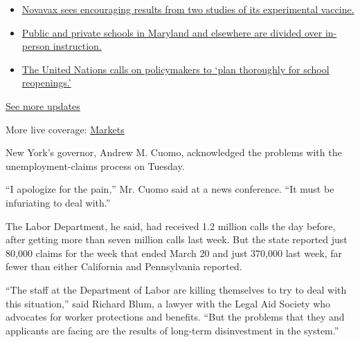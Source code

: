 \begin{itemize}
\tightlist
\item
  \href{https://www.nytimes.com/2020/08/04/world/coronavirus-cases.html?action=click\&pgtype=Article\&state=default\&region=MAIN_CONTENT_1\&context=storylines_live_updates\#link-1228a480}{Novavax
  sees encouraging results from two studies of its experimental
  vaccine.}
\item
  \href{https://www.nytimes.com/2020/08/04/world/coronavirus-cases.html?action=click\&pgtype=Article\&state=default\&region=MAIN_CONTENT_1\&context=storylines_live_updates\#link-4825b93}{Public
  and private schools in Maryland and elsewhere are divided over
  in-person instruction.}
\item
  \href{https://www.nytimes.com/2020/08/04/world/coronavirus-cases.html?action=click\&pgtype=Article\&state=default\&region=MAIN_CONTENT_1\&context=storylines_live_updates\#link-50f7386d}{The
  United Nations calls on policymakers to `plan thoroughly for school
  reopenings.'}
\end{itemize}

\href{https://www.nytimes.com/2020/08/04/world/coronavirus-cases.html?action=click\&pgtype=Article\&state=default\&region=MAIN_CONTENT_1\&context=storylines_live_updates}{See
more updates}

More live coverage:
\href{https://www.nytimes.com/live/2020/08/04/business/stock-market-today-coronavirus?action=click\&pgtype=Article\&state=default\&region=MAIN_CONTENT_1\&context=storylines_live_updates}{Markets}

New York's governor, Andrew M. Cuomo, acknowledged the problems with the
unemployment-claims process on Tuesday.

``I apologize for the pain,'' Mr. Cuomo said at a news conference. ``It
must be infuriating to deal with.''

The Labor Department, he said, had received 1.2 million calls the day
before, after getting more than seven million calls last week. But the
state reported just 80,000 claims for the week that ended March 20 and
just 370,000 last week, far fewer than either California and
Pennsylvania reported.

``The staff at the Department of Labor are killing themselves to try to
deal with this situation,'' said Richard Blum, a lawyer with the Legal
Aid Society who advocates for worker protections and benefits. ``But the
problems that they and applicants are facing are the results of
long-term disinvestment in the system.''

